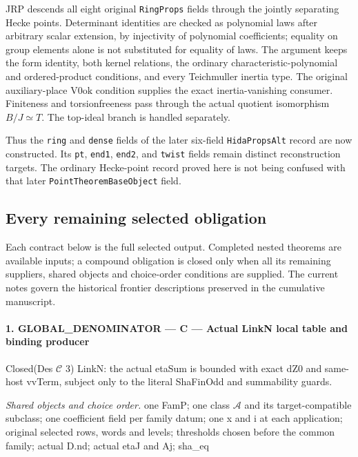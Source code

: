 JRP descends all eight original \texttt{Ring\allowbreak Props} fields through
the jointly separating Hecke points.  Determinant identities are
checked as polynomial laws after arbitrary scalar extension, by
injectivity of polynomial coefficients; equality on group elements
alone is not substituted for equality of laws.  The argument keeps
the form identity, both kernel relations, the ordinary
characteristic-polynomial and ordered-product conditions, and every
Teichmuller inertia type.  The original auxiliary-place
$\mathrm{V0ok}$ condition supplies the exact inertia-vanishing
consumer.  Finiteness and torsionfreeness pass through the actual
quotient isomorphism $B/J\simeq T$.  The top-ideal branch is
handled separately.

Thus the \texttt{ring} and \texttt{dense} fields of the later
six-field \texttt{Hida\allowbreak Props\allowbreak Alt} record are now constructed.
Its \texttt{pt}, \texttt{end1}, \texttt{end2}, and
\texttt{twist} fields remain distinct reconstruction targets.
The ordinary Hecke-point record proved here is not being confused
with that later \texttt{Point\allowbreak Theorem\allowbreak Base\allowbreak Object} field.

\subsection{Every remaining selected obligation}

Each contract below is the full selected output.  Completed nested
theorems are available inputs; a compound obligation is closed only
when all its remaining suppliers, shared objects and choice-order
conditions are supplied.  The current notes govern the historical
frontier descriptions preserved in the cumulative manuscript.
\paragraph{1. GLOBAL\_\allowbreak DENOMINATOR — C — Actual LinkN local table and binding producer}

Closed(Des $\mathcal C$ 3) LinkN: the actual etaSum is bounded with exact dZ0 and same-host vvTerm, subject only to the literal ShaFinOdd and summability guards.

\emph{Shared objects and choice order.} one FamP; one class $\mathcal A$ and its target-compatible subclass; one coefficient field per family datum; one x and i at each application; original selected rows, words and levels; thresholds chosen before the common family; actual D.nd; actual etaJ and Aj; sha\_\allowbreak eq


